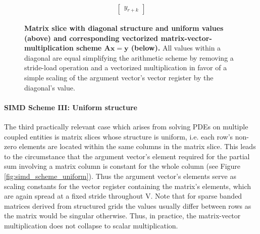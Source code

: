 \begin{figure}[ht]
$$\begin{matrix}
\begin{bmatrix}
                                                                                                                 y_{r+k}
                                                                                                                \end{bmatrix}
        \end{matrix}
        $$
        \caption[Matrix slice with diagonal structure and uniform values and corresponding vectorized matrix-vector-multiplication scheme.]{\textbf{Matrix slice with diagonal structure and uniform values (above) and corresponding vectorized matrix-vector-multiplication scheme $\bm{Ax = y}$ (below).} All values within a diagonal are equal simplifying the arithmetic scheme by removing a stride-load operation and a vectorized multiplication in favor of a simple scaling of the argument vector's vector register by the diagonal's value.}
        \label{fig:simd_scheme_diag_collated}
      \end{figure}

      \paragraph{SIMD Scheme III: Uniform structure}

      The third practically relevant case which arises from solving PDEs on multiple coupled entities is matrix slices whose structure is uniform, i.e. each row's non-zero elements are located within the same columns in the matrix slice. This leads to the circumstance that the argument vector's element required for the partial sum involving a matrix column is constant for the whole column (see Figure \ref{fig:simd_scheme_uniform}). Thus the argument vector's elements serve as scaling constants for the vector register containing the matrix's elements, which are again spread at a fixed stride throughout V. Note that for sparse banded matrices derived from structured grids the values usually differ between rows as the matrix would be singular otherwise. Thus, in practice, the matrix-vector multiplication does not collapse to scalar multiplication.

